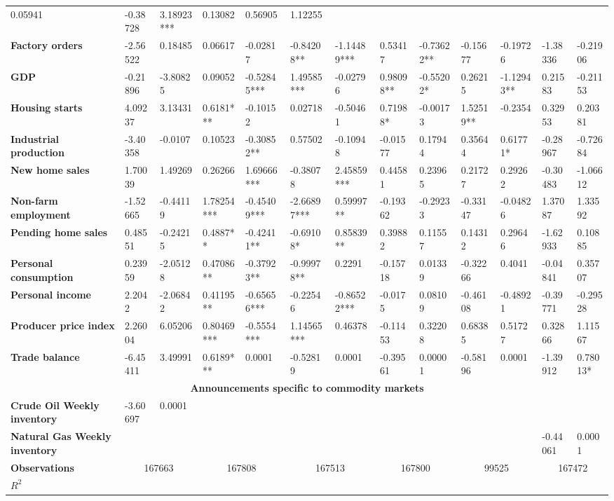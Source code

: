 \begin{sidewaystable}
{\begin{tabular}{@{}lllllllllllll@{}}
0.05941 & -0.38728 & 3.18923*** & 0.13082 & 0.56905 & 1.12255 \\ \textbf{Factory orders}& -2.56522 & 0.18485 & 0.06617 & -0.02817 & -0.84208** & -1.14489*** & 0.53417 & -0.73622** & -0.15677 & -0.19726 & -1.38336 & -0.21906 \\ \textbf{GDP}& -0.21896 & -3.80825 & 0.09052 & -0.52845*** & 1.49585*** & -0.02796 & 0.98098** & -0.55202* & 0.26215 & -1.12943** & 0.21583 & -0.21153 \\ \textbf{Housing starts}& 4.09237 & 3.13431 & 0.6181*** & -0.10152 & 0.02718 & -0.50461 & 0.71988* & -0.00173 & 1.52519** & -0.2354 & 0.32953 & 0.20381 \\ \textbf{Industrial production}& -3.40358 & -0.0107 & 0.10523 & -0.30852** & 0.57502 & -0.10948 & -0.01577 & 0.17944 & 0.35644 & 0.61771* & -0.28967 & -0.72684 \\ \textbf{New home sales}& 1.70039 & 1.49269 & 0.26266 & 1.69666*** & -0.38078 & 2.45859*** & 0.44581 & 0.23965 & 0.21727 & 0.29262 & -0.30483 & -1.06612 \\ \textbf{Non-farm employment}& -1.52665 & -0.44119 & 1.78254***& -0.45409***& -2.66897*** & 0.59997** & -0.19362 & -0.29233 & -0.33147 & -0.04826 & 1.37087 & 1.33592 \\ \textbf{Pending home sales}& 0.48551 & -0.24215 & 0.4887**& -0.42411**& -0.69108* & 0.85839** & 0.39882 & 0.11557 & 0.14312 & 0.29646 & -1.62933 & 0.10885 \\ \textbf{Personal consumption}& 0.23959 & -2.05128 & 0.47086**& -0.37923**& -0.99978** & 0.2291 & -0.15718 & 0.01339 & -0.32266 & 0.4041 & -0.04841 & 0.35707 \\ \textbf{Personal income}& 2.2042 & -2.06842 & 0.41195**& -0.65656*** & -0.22546 & -0.86522*** & -0.0175 & 0.08109 & -0.46108 & -0.48921 & -0.39771 & -0.29528 \\ \textbf{Producer price index}& 2.26004 & 6.05206 & 0.80469*** & -0.5554***& 1.14565*** & 0.46378 & -0.11453 & 0.32208 & 0.68385 & 0.51727 & 0.32866 & 1.11567 \\ \textbf{Trade balance}& -6.45411 & 3.49991 & 0.6189***& 0.0001& -0.52819 & 0.0001& -0.39561 & 0.00001& -0.58196 & 0.0001& -1.39912 & 0.78013* \\  \midrule \multicolumn{13}{c}{\textbf{Announcements specific to commodity markets}} \\ \midrule \textbf{Crude Oil Weekly inventory}& -3.60697 & 0.0001&  &  &  &  &  &  &  &  &  &  \\ \textbf{Natural Gas Weekly inventory}&  &  &  &  &  &  &  &  &  &  & -0.44061 & 0.0001\\  \midrule \textbf{Observations}             &\multicolumn{2}{c}{ 167663 }                                                 & \multicolumn{2}{c}{ 167808 }                                                 & \multicolumn{2}{c}{ 167513 }                                                 & \multicolumn{2}{c}{ 167800 }                                                 & \multicolumn{2}{c}{ 99525 }                                                   & \multicolumn{2}{c}{ 167472 }                                                 \\ \textbf{$R^2$}             
\end{tabular}}
\end{sidewaystable}
